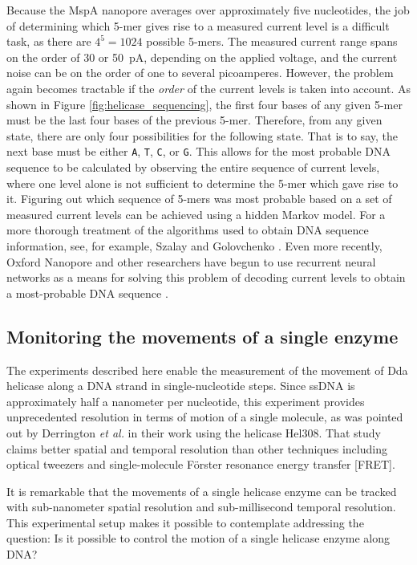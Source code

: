 Because the MspA nanopore averages over approximately five nucleotides, the job of determining which 5-mer gives rise to a measured current level is a difficult task, as there are $4^5 = 1024$ possible 5-mers.  The measured current range spans on the order of \num{30} or \SI{50}{\pA}, depending on the applied voltage, and the current noise can be on the order of one to several picoamperes.  However, the problem again becomes tractable if the \textit{order} of the current levels is taken into account.  As shown in Figure \ref{fig:helicase_sequencing}, the first four bases of any given 5-mer must be the last four bases of the previous 5-mer.  Therefore, from any given state, there are only four possibilities for the following state.  That is to say, the next base must be either \texttt{A}, \texttt{T}, \texttt{C}, or \texttt{G}.  This allows for the most probable DNA sequence to be calculated by observing the entire sequence of current levels, where one level alone is not sufficient to determine the 5-mer which gave rise to it.  Figuring out which sequence of 5-mers was most probable based on a set of measured current levels can be achieved using a hidden Markov model.  For a more thorough treatment of the algorithms used to obtain DNA sequence information, see, for example, Szalay and Golovchenko \citep{Szalay2015}.  Even more recently, Oxford Nanopore and other researchers have begun to use recurrent neural networks as a means for solving this problem of decoding current levels to obtain a most-probable DNA sequence \citep{Boza2017}.

\subsection{Monitoring the movements of a single enzyme}

The experiments described here enable the measurement of the movement of Dda helicase along a DNA strand in single-nucleotide steps.  Since ssDNA is approximately half a nanometer per nucleotide, this experiment provides unprecedented resolution in terms of motion of a single molecule, as was pointed out by Derrington \textit{et al.} \citep{Derrington2015} in their work using the helicase Hel308.  That study claims better spatial and temporal resolution than other techniques including optical tweezers and single-molecule F\"orster resonance energy transfer [FRET].

It is remarkable that the movements of a single helicase enzyme can be tracked with sub-nanometer spatial resolution and sub-millisecond temporal resolution.  This experimental setup makes it possible to contemplate addressing the question: Is it possible to control the motion of a single helicase enzyme along DNA?
